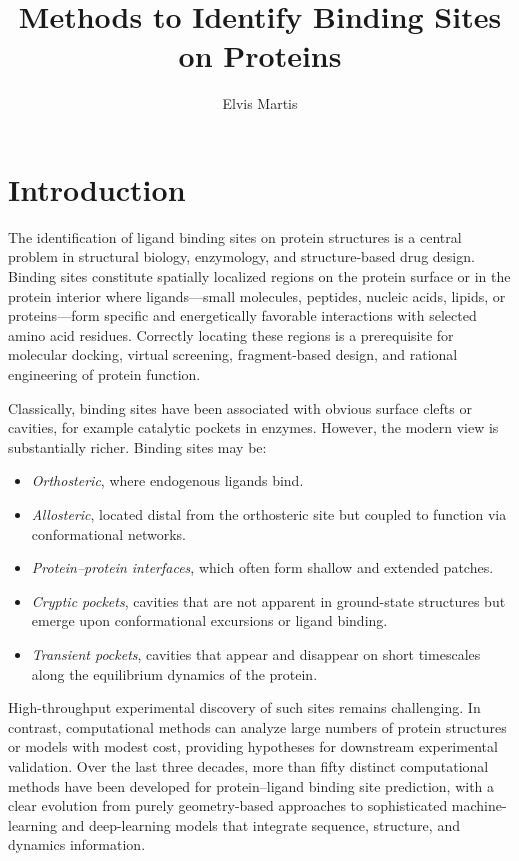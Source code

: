 \documentclass[12pt,a4paper]{article}
\title{Methods to Identify Binding Sites on Proteins}
\author{Elvis Martis}
\date{}
\begin{document}
\maketitle


\section{Introduction}

The identification of ligand binding sites on protein structures is a central problem in structural biology, enzymology, and structure-based drug design. Binding sites constitute spatially localized regions on the protein surface or in the protein interior where ligands---small molecules, peptides, nucleic acids, lipids, or proteins---form specific and energetically favorable interactions with selected amino acid residues. Correctly locating these regions is a prerequisite for molecular docking, virtual screening, fragment-based design, and rational engineering of protein function.

Classically, binding sites have been associated with obvious surface clefts or cavities, for example catalytic pockets in enzymes. However, the modern view is substantially richer. Binding sites may be:
\begin{itemize}
    \item \emph{Orthosteric}, where endogenous ligands bind.
    \item \emph{Allosteric}, located distal from the orthosteric site but coupled to function via conformational networks.
    \item \emph{Protein--protein interfaces}, which often form shallow and extended patches.
    \item \emph{Cryptic pockets}, cavities that are not apparent in ground-state structures but emerge upon conformational excursions or ligand binding.
    \item \emph{Transient pockets}, cavities that appear and disappear on short timescales along the equilibrium dynamics of the protein.
\end{itemize}

High-throughput experimental discovery of such sites remains challenging. In contrast, computational methods can analyze large numbers of protein structures or models with modest cost, providing hypotheses for downstream experimental validation. Over the last three decades, more than fifty distinct computational methods have been developed for protein--ligand binding site prediction, with a clear evolution from purely geometry-based approaches to sophisticated machine-learning and deep-learning models that integrate sequence, structure, and dynamics information.\cite{CH5_ghersi2011beyond,CH5_zhao2020exploring,CH5_LeGuilloux2009}
\end{document}
